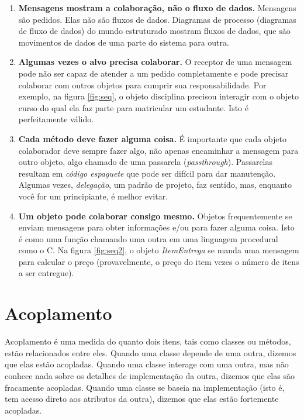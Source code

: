\documentclass[
	article,			%
	12pt,				%
	openright,
	twoside,			%
	a4paper,			%
	english,			%
	french,
	brazil,				%
	sumario=tradicional
	]{abntex2}
\begin{document}
\begin{enumerate}
\item \textbf{Mensagens mostram a colaboração, não o fluxo de dados.} Mensagens são pedidos. Elas não são fluxos de dados. Diagramas de processo (diagramas de fluxo de dados) do mundo estruturado mostram fluxos de dados, que são movimentos de dados de uma parte do sistema para outra.

\item \textbf{Algumas vezes o alvo precisa colaborar.} O receptor de uma mensagem pode não ser capaz de atender a um pedido completamente  e pode precisar colaborar com outros objetos para cumprir sua responsabilidade. Por exemplo, na figura \ref{fig:seq}, o objeto disciplina precisou interagir com o objeto curso do qual ela faz parte para matricular um estudante. Isto é perfeitamente válido.

\item \textbf{Cada método deve fazer alguma coisa.} É importante que cada objeto colaborador deve sempre fazer algo, não apenas encaminhar a mensagem para outro objeto, algo chamado de uma passarela (\textit{passthrough}). Passarelas resultam em \textit{código espaguete} que pode ser difícil para dar manutenção. Algumas vezes, \textit{delegação}, um padrão de projeto, faz sentido, mas, enquanto você for um principiante, é melhor evitar.

\item \textbf{Um objeto pode colaborar consigo mesmo.} Objetos frequentemente se enviam mensagens para obter informações e/ou para fazer alguma coisa. Isto é como uma função chamando uma outra em uma linguagem procedural como o C. Na figura \ref{fig:seq2}, o objeto \emph{ItemEntrega} se manda uma mensagem para calcular o preço (provavelmente, o preço do item vezes o número de itens a ser entregue).

\end{enumerate}

\section{Acoplamento}

Acoplamento é uma medida do quanto dois itens, tais como classes ou métodos, estão relacionados entre eles. Quando uma classe depende de uma outra, dizemos que elas estão acopladas. Quando uma classe interage com uma outra, mas não conhece nada sobre os detalhes de implementação da outra, dizemos que elas são fracamente acopladas. Quando uma classe se baseia na implementação (isto é, tem acesso direto aos atributos da outra), dizemos que elas estão fortemente acopladas.
\end{document}
